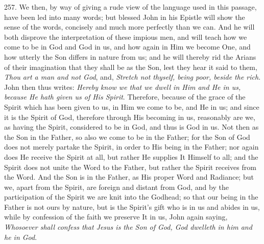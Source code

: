 257. We then,
by way of giving a rude view of the language used in this passage,
have been led into many words; but blessed John in his Epistle will
show the sense of the words, concisely and much more perfectly than we
can. And he will both disprove the interpretation of these impious
men, and will teach how we come to be in God and God in us, and how
again in Him we become One, and how utterly the Son differs in nature
from us; and he will thereby rid the Arians of their imagination that
they shall be as the Son, lest they hear it said to them, \emph{Thou art
a man and not God}, and, \emph{Stretch not thyself, being poor, beside
the rich}. John then thus writes: \emph{Hereby know we that we dwell
in Him and He in us, because He hath given us of His Spirit}.
Therefore, because of the grace of the Spirit which has been given to
us, in Him we come to be, and He in us; and since it is the Spirit of
God, therefore through His becoming in us, reasonably are we, as
having the Spirit, considered to be in God, and thus is God in
us. Not then as the Son in the Father, so also we come to be in the
Father; for the Son of God does not merely partake the Spirit, in
order to His being in the Father; nor again does He receive the Spirit
at all, but rather He supplies It Himself to all; and the Spirit does
not unite the Word to the Father, but rather the Spirit receives from
the Word. And the Son is in the Father, as His proper Word and
Radiance; but we, apart from the Spirit, are foreign and distant from
God, and by the participation of the Spirit we are knit into the
Godhead; so that our being in the Father is not ours by nature, but is
the Spirit's gift who is in us and abides in us, while by confession
of the faith we preserve It in us, John again saying, \emph{Whosoever
shall confess that Jesus is the Son of God, God dwelleth in him and he
in God}.

